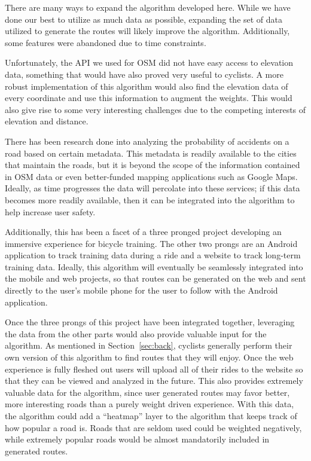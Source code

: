 \documentclass[twocolumn,12pt]{article}
\begin{document}
There are many ways to expand the algorithm developed here. While we have done
our best to utilize as much data as possible, expanding the set of data utilized
to generate the routes will likely improve the algorithm. Additionally, some
features were abandoned due to time constraints.

Unfortunately, the API we used for OSM did not have easy access to elevation
data, something that would have also proved very useful to cyclists. A more
robust implementation of this algorithm would also find the elevation data of
every coordinate and use this information to augment the weights. This would
also give rise to some very interesting challenges due to the competing
interests of elevation and distance.

There has been research done into analyzing the probability of accidents
on a road based on certain metadata. This metadata is readily available to the
cities that maintain the roads, but it is beyond the scope of the information
contained in OSM data or even better-funded mapping applications such as
Google Maps. Ideally, as time progresses the data will percolate into these
services; if this data becomes more readily available, then it can be integrated
into the algorithm to help increase user safety.

Additionally, this has been a facet of a three pronged project developing an
immersive experience for bicycle training. The other two prongs are an
Android application to track training data during a ride and a website to track
long-term training data. Ideally, this algorithm will eventually be seamlessly
integrated into the mobile and web projects, so that routes can be generated
on the web and sent directly to the user's mobile phone for the user to follow
with the Android application.

Once the three prongs of this project have been integrated together, leveraging
the data from the other parts would also provide valuable input for the
algorithm. As mentioned in Section~\ref{sec:back}, cyclists generally perform
their own version of this algorithm to find routes that they will enjoy. Once
the web experience is fully fleshed out users will upload all of their rides
to the website so that they can be viewed and analyzed in the future. This also
provides extremely valuable data for the algorithm, since user generated routes
may favor better, more interesting roads than a purely weight driven experience.
With this data, the algorithm could add a ``heatmap'' layer to the algorithm
that keeps track of how popular a road is. Roads that are seldom used could be
weighted negatively, while extremely popular roads would be almost mandatorily
included in generated routes.
\end{document}

